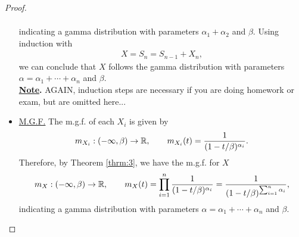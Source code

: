 \begin{proof}
\begin{itemize}
\begin{align*}
		\end{align*}
		indicating a gamma distribution with parameters $\alpha_1+\alpha_2$ and $\beta$. Using induction with
		\begin{align*}
		X = S_n = S_{n-1} + X_n,
		\end{align*}
		we can conclude that $X$ follows the gamma distribution with parameters $\alpha = \alpha_1 + \cdots + \alpha_n$ and $\beta$. \\
		\textbf{\underline{Note}.} AGAIN, induction steps are necessary if you are doing homework or exam, but are omitted here...
		\item \underline{M.G.F.} The m.g.f. of each $X_i$ is given by
		\begin{align*}
		m_{X_i}: (-\infty, \beta) \rightarrow\mathbb{R}, \qquad m_{X_i}(t) = \frac{1}{(1-t/\beta)^{\alpha_i}}.
		\end{align*}
		Therefore, by Theorem \ref{thrm:3}, we have the m.g.f. for $X$
		\begin{align*}
		m_X: (-\infty, \beta) \rightarrow \mathbb{R}, \qquad m_{X}(t) = \prod_{i=1}^n \frac{1}{(1-t/\beta)^{\alpha_i}} = \frac{1}{(1-t/\beta)^{\sum_{i=1}^n\alpha_i}},
		\end{align*}
		indicating a gamma distribution with parameters $\alpha = \alpha_1 + \cdots + \alpha_n$ and $\beta$.
	\end{itemize}
\end{proof}


